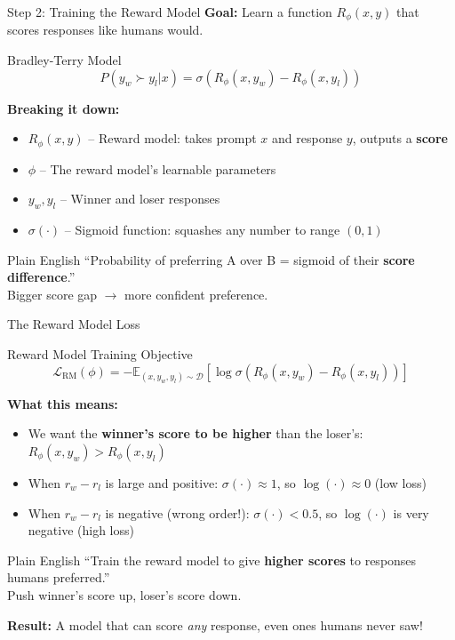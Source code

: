\documentclass[aspectratio=169,11pt]{beamer}
\newcommand{\highlight}[1]{\textcolor{accentorange}{\textbf{#1}}}
\newcommand{\important}[1]{\textcolor{primaryblue}{\textbf{#1}}}
\begin{document}
\begin{frame}{Step 2: Training the Reward Model}
\textbf{Goal:} Learn a function $R_\phi(x, y)$ that scores responses like humans would.

\begin{block}{Bradley-Terry Model}
\vspace{-0.2cm}
\[
P(y_w \succ y_l | x) = \sigma\left( R_\phi(x, y_w) - R_\phi(x, y_l) \right)
\]
\vspace{-0.2cm}
\end{block}

\textbf{Breaking it down:}
\begin{itemize}\itemsep0pt
    \item $R_\phi(x, y)$ -- Reward model: takes prompt $x$ and response $y$, outputs a \important{score}
    \item $\phi$ -- The reward model's learnable parameters
    \item $y_w, y_l$ -- Winner and loser responses
    \item $\sigma(\cdot)$ -- Sigmoid function: squashes any number to range $(0, 1)$
\end{itemize}

\begin{block}{Plain English}
``Probability of preferring A over B = sigmoid of their \highlight{score difference}.''\\
Bigger score gap $\rightarrow$ more confident preference.
\end{block}
\end{frame}

\begin{frame}{The Reward Model Loss}
\begin{block}{Reward Model Training Objective}
\[
\mathcal{L}_{\text{RM}}(\phi) = -\mathbb{E}_{(x, y_w, y_l) \sim \mathcal{D}} \left[ \log \sigma(R_\phi(x, y_w) - R_\phi(x, y_l)) \right]
\]
\end{block}

\textbf{What this means:}
\begin{itemize}
    \item We want the \important{winner's score to be higher} than the loser's: $R_\phi(x, y_w) > R_\phi(x, y_l)$
    \item When $r_w - r_l$ is large and positive: $\sigma(\cdot) \approx 1$, so $\log(\cdot) \approx 0$ (low loss)
    \item When $r_w - r_l$ is negative (wrong order!): $\sigma(\cdot) < 0.5$, so $\log(\cdot)$ is very negative (high loss)
\end{itemize}

\vspace{0.2cm}
\begin{block}{Plain English}
``Train the reward model to give \highlight{higher scores} to responses humans preferred.''\\
Push winner's score up, loser's score down.
\end{block}

\textbf{Result:} A model that can score \textit{any} response, even ones humans never saw!
\end{frame}
\end{document}
